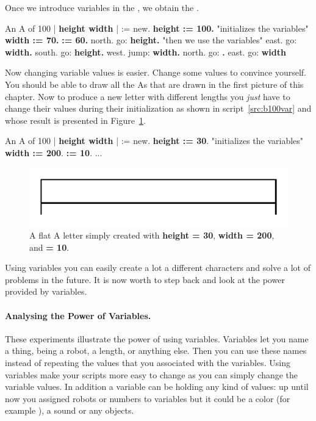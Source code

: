 Once we introduce variables in the , we obtain the
.

\begin{scriptwithtitle}{An A of 100}\label{src:a100var}
| \caro \textbf{height width \dist}|
\caro := \Turtle new.
\textbf{height := 100.}                       "initializes the variables"
\textbf{width := 70.}
\textbf{\dist := 60.}
\caro north.
\caro go: \textbf{height.}                    "then we use the variables"
\caro east.
\caro go: \textbf{width.}
\caro south.
\caro go: \textbf{height.}
\caro west.
\caro jump: \textbf{width.}
\caro north.
\caro go: \textbf{\dist.}
\caro east.
\caro go: \textbf{width}
\end{scriptwithtitle}

Now changing variable values is easier. Change some values to convince yourself. You should be able to draw all the As that are drawn in the first picture of this chapter.
Now to produce a new letter with different lengths you \emph{just} have to change their values during their initialization as shown in script~\ref{src:b100var} and whose result is presented in Figure~\ref{fig:varAFlat}.

\begin{scriptwithtitle}{An A of 100}\label{src:b100var}
| \caro \textbf{height width \dist}|
\caro := \Turtle new.
\textbf{height := 30}.                "initializes the variables"
\textbf{width := 200}.
\textbf{\dist := 10}.
...
\end{scriptwithtitle}

\begin{figure}[h]
\begin{center}\includegraphics{varAFlat}\end{center}
\caption{A flat A letter simply created with \textbf{height = 30}, \textbf{width = 200}, and 
\textbf{\dist = 10}.}\label{fig:varAFlat}
\end{figure}

Using variables you can easily create a lot a different characters and solve a lot of problems in the future. It is now worth to step back and look at the power provided by variables.

\paragraph{Analysing the Power of Variables.}
These experiments illustrate the power of using variables. Variables let you name a thing, being a robot, a length, or anything else.  Then you can use these names instead of repeating the values that you associated with the variables. Using variables make your scripts more easy to change as you can simply change the variable values. In addition a variable can be holding any kind of values: up until now you assigned robots or numbers to variables but it could be a color (for example ), a sound or any \sq objects. 

